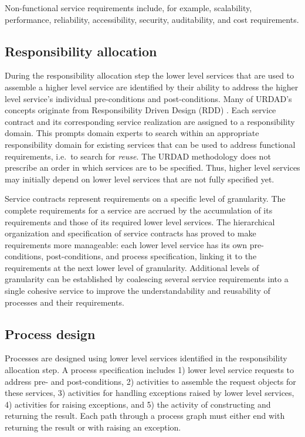 Non-functional service requirements include, for example, scalability, performance, reliability, accessibility, security, auditability, and cost requirements. 

\subsection{Responsibility allocation}

During the responsibility allocation step the lower level services that are used to assemble a higher level service are identified by their ability to address the higher level service's individual pre-conditions and post-conditions. Many of URDAD's concepts originate from Responsibility Driven Design (RDD) \cite{wirfs-brock_object-oriented_1989,wirfs-brock_object_2002}. Each service contract and its corresponding service realization are assigned to a responsibility domain. This prompts domain experts to search within an appropriate responsibility domain for existing services that can be used to address functional requirements, i.e.\ to search for \emph{reuse}. The URDAD methodology does not prescribe an order in which services are to be specified. Thus, higher level services may initially depend on lower level services that are not fully specified yet.

Service contracts represent requirements on a specific level of granularity. The complete requirements for a service are accrued by the accumulation of its requirements and those of its required lower level services. The hierarchical organization and specification of service contracts has proved to make requirements more manageable: each lower level service has its own pre-conditions, post-conditions, and process specification, linking it to the requirements at the next lower level of granularity. Additional levels of granularity can be established by coalescing several service requirements into a single cohesive service to improve the understandability and reusability of processes and their requirements.

\subsection{Process design}

Processes are designed using lower level services identified in the responsibility allocation step. A process specification includes 1) lower level service requests to address pre- and post-conditions, 2) activities to assemble the request objects for these services, 3) activities for handling exceptions raised by lower level services, 4) activities for raising exceptions, and 5) the activity of constructing and returning the result. Each path through a process graph must either end with returning the result or with raising an exception.